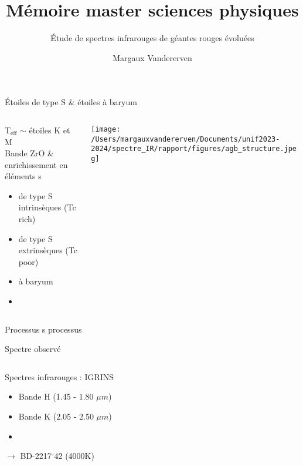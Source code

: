 \documentclass[10pt]{beamer}
\title{Mémoire master sciences physiques}
\subtitle{Étude de spectres infrarouges de géantes rouges évoluées}
\date{}
\author{\small Margaux Vandererven}
\institute{\small Supervisé par Sophie Van Eck}
\begin{document}
\maketitle


\begin{frame}[fragile]{Étoiles de type S \& étoiles à baryum}

    \begin{columns}
            \begin{column}{0.5\textwidth}
                    T$_{\text{eff}}$ $\sim$ étoiles K et M \\
                    Bande ZrO \& enrichissement en éléments s \\
    					\begin{itemize}
    						\item de type S intrinsèques (Tc rich)
    						\item de type S extrinsèques (Tc poor)
    						\item à baryum
    						\item[] 
    					\end{itemize} 
            \end{column}
            \begin{column}{0.5\textwidth}
                \centering
                \texttt{[image: /Users/margauxvandererven/Documents/unif2023-2024/spectre\_IR/rapport/figures/agb\_structure.jpeg]}
            \end{column}
    \end{columns}
\end{frame}

\begin{frame}[fragile]{Processus s}
    processus
\end{frame}

\begin{frame}[fragile]{Spectre observé}
\begin{columns}
    \begin{column}{0.5\textwidth}
             Spectres infrarouges : IGRINS 
    					\begin{itemize}
    						\item Bande H (1.45 - 1.80 $\mu m$)
    						\item Bande K (2.05 - 2.50 $\mu m$)
    						\item[]
    					\end{itemize}
        $\rightarrow$ BD-2217$^{\circ}$42 (4000K)
    \end{column}
\end{columns}
\end{frame}
\end{document}
